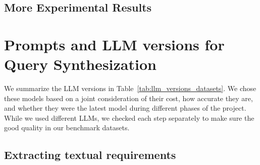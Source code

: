 \subsection{More Experimental Results}
\label{app:exp}


\section{Prompts and LLM versions for Query Synthesization}
\label{app:prompts}

We summarize the LLM versions in Table~\ref{tab:llm_versions_datasets}. 
We chose these models based on a joint consideration of their cost, how accurate they are, and whether they were the latest model during different phases of the project. While we used different LLMs, we checked each step separately to make sure the good quality in our benchmark datasets.

\begin{table}[h]
    \centering
    \caption{Summary of LLM Versions for Query Synthesization}
    \label{tab:llm_versions_datasets}
\end{table}

\subsection{Extracting textual requirements}
\label{app:text}


